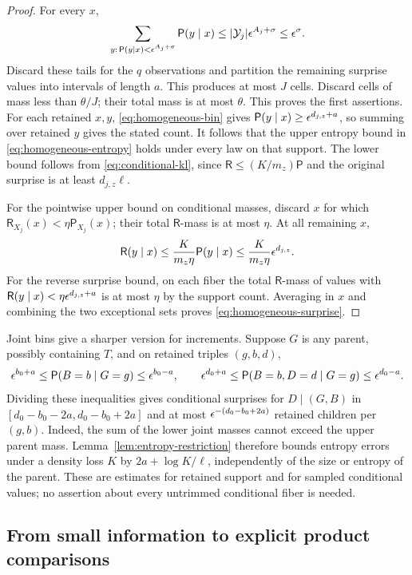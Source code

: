 \begin{proof}
For every $x$,
\[
 \sum_{y:\,\mathsf P(y\mid x)<\epsilon^{A_j+\sigma}}
       \mathsf P(y\mid x)\le|\mathcal Y_j|\epsilon^{A_j+\sigma}
       \le\epsilon^\sigma.
\]
Discard these tails for the $q$ observations and partition the remaining
surprise values into intervals of length $a$.  This produces at most
$J$ cells.  Discard cells of mass less than $\theta/J$; their total mass
is at most $\theta$.  This proves the first assertions.
For each retained $x,y$, \eqref{eq:homogeneous-bin} gives
$\mathsf P(y\mid x)\ge\epsilon^{d_{j,z}+a}$, so summing over retained $y$
gives the stated count.  It follows that the upper entropy bound in
\eqref{eq:homogeneous-entropy} holds under every law on that support.
The lower bound follows from \eqref{eq:conditional-kl}, since
$\mathsf R\le(K/m_z)\mathsf P$ and the original surprise is at least
$d_{j,z}\ell$.

For the pointwise upper bound on conditional masses, discard $x$ for
which $\mathsf R_{X_j}(x)<\eta\mathsf P_{X_j}(x)$; their total
$\mathsf R$-mass is at most $\eta$.  At all remaining $x$,
\[
 \mathsf R(y\mid x)
 \le\frac{K}{m_z\eta}\mathsf P(y\mid x)
 \le\frac{K}{m_z\eta}\epsilon^{d_{j,z}}.
\]
For the reverse surprise bound, on each fiber the total
$\mathsf R$-mass of values with
$\mathsf R(y\mid x)<\eta\epsilon^{d_{j,z}+a}$ is at most $\eta$ by the
support count.  Averaging in $x$ and combining the two exceptional
sets proves \eqref{eq:homogeneous-surprise}.
\end{proof}

Joint bins give a sharper version for increments.  Suppose $G$ is any
parent, possibly containing $T$, and on retained triples $(g,b,d)$,
\[
 \epsilon^{b_0+a}\le\mathsf P(B=b\mid G=g)\le\epsilon^{b_0-a},
 \qquad
 \epsilon^{d_0+a}\le\mathsf P(B=b,D=d\mid G=g)\le\epsilon^{d_0-a}.
\]
Dividing these inequalities gives conditional surprises for
$D\mid(G,B)$ in $[d_0-b_0-2a,d_0-b_0+2a]$ and at most
$\epsilon^{-(d_0-b_0+2a)}$ retained children per $(g,b)$.
Indeed, the sum of the lower joint masses cannot exceed the upper
parent mass.  Lemma~\ref{lem:entropy-restriction} therefore bounds
entropy errors under a density loss $K$ by $2a+\log K/\ell$,
independently of the size or entropy of the parent.
These are estimates for retained support and for sampled conditional
values; no assertion about every untrimmed conditional fiber is needed.

\subsection{From small information to explicit product comparisons}

